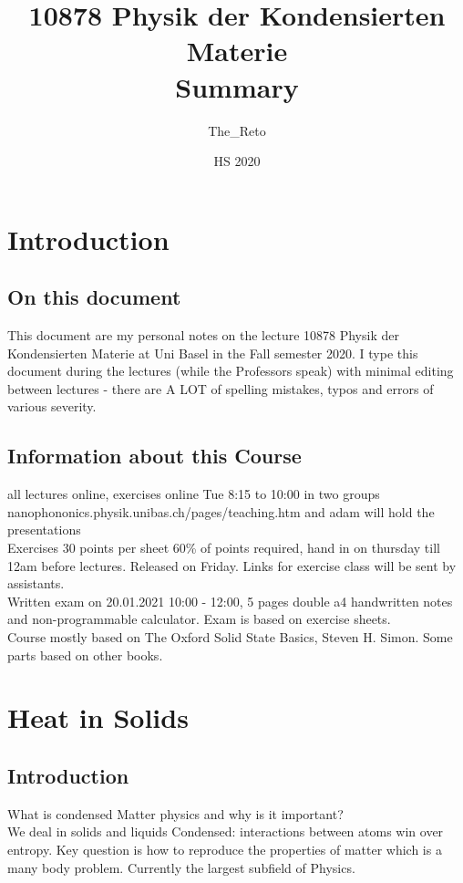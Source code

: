 \documentclass{report}
\title{10878 Physik der Kondensierten Materie\\
        \large Summary
        }
\author{The\_Reto}
\date{HS 2020}
\begin{document}
\maketitle
    
\chapter*{Introduction}
\section*{On this document}
This document are my personal notes on the lecture 10878 Physik der Kondensierten Materie at Uni Basel in the Fall semester 2020. I type this document during the lectures (while the Professors speak) with minimal editing between lectures - there are A LOT of spelling mistakes, typos and errors of various severity.
\section*{Information about this Course}
all lectures online, exercises online Tue 8:15 to 10:00 in two groups\\
nanophononics.physik.unibas.ch/pages/teaching.htm and adam will hold the presentations\\
Exercises 30 points per sheet 60\% of points required, hand in on thursday till 12am before lectures. Released on Friday. Links for exercise class will be sent by assistants.\\

Written exam on 20.01.2021 10:00 - 12:00, 5 pages double a4 handwritten notes and non-programmable calculator. Exam is based on exercise sheets. \\

Course mostly based on The Oxford Solid State Basics, Steven H. Simon. Some parts based on other books.


\tableofcontents
\newpage
\chapter{Heat in Solids}
\section{Introduction}
What is condensed Matter physics and why is it important? \\
We deal in solids and liquids Condensed: interactions between atoms win over entropy. Key question is how to reproduce the properties of matter which is a many body problem. Currently the largest subfield of Physics.\\
\end{document}
